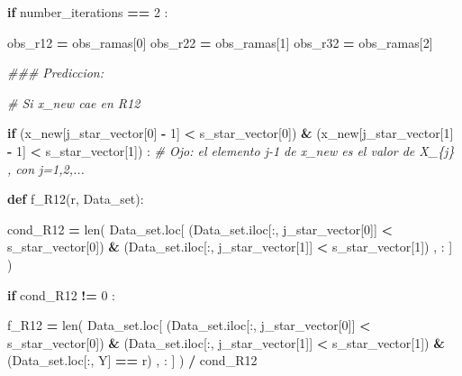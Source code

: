 \documentclass[
  11pt,
  a4paper,
]{article}
\newenvironment{Shaded}{\begin{snugshade}}{\end{snugshade}}
\newcommand{\BuiltInTok}[1]{#1}
\newcommand{\CommentTok}[1]{\textcolor[rgb]{0.56,0.35,0.01}{\textit{#1}}}
\newcommand{\ControlFlowTok}[1]{\textcolor[rgb]{0.13,0.29,0.53}{\textbf{#1}}}
\newcommand{\DecValTok}[1]{\textcolor[rgb]{0.00,0.00,0.81}{#1}}
\newcommand{\KeywordTok}[1]{\textcolor[rgb]{0.13,0.29,0.53}{\textbf{#1}}}
\newcommand{\NormalTok}[1]{#1}
\newcommand{\OperatorTok}[1]{\textcolor[rgb]{0.81,0.36,0.00}{\textbf{#1}}}
\newcommand{\StringTok}[1]{\textcolor[rgb]{0.31,0.60,0.02}{#1}}
\begin{document}
\begin{Shaded}
\begin{Highlighting}[]
        
    \ControlFlowTok{if}\NormalTok{ number\_iterations }\OperatorTok{==} \DecValTok{2}\NormalTok{ :}

\NormalTok{            obs\_r12 }\OperatorTok{=}\NormalTok{ obs\_ramas[}\DecValTok{0}\NormalTok{]}
\NormalTok{            obs\_r22 }\OperatorTok{=}\NormalTok{ obs\_ramas[}\DecValTok{1}\NormalTok{]}
\NormalTok{            obs\_r32 }\OperatorTok{=}\NormalTok{ obs\_ramas[}\DecValTok{2}\NormalTok{]}


        \CommentTok{\#\#\# Prediccion:}

            \CommentTok{\# Si x\_new cae en R12}
           
            \ControlFlowTok{if}\NormalTok{ (x\_new[j\_star\_vector[}\DecValTok{0}\NormalTok{] }\OperatorTok{{-}} \DecValTok{1}\NormalTok{] }\OperatorTok{\textless{}}\NormalTok{ s\_star\_vector[}\DecValTok{0}\NormalTok{]) }\OperatorTok{\&}\NormalTok{ (x\_new[j\_star\_vector[}\DecValTok{1}\NormalTok{] }\OperatorTok{{-}} \DecValTok{1}\NormalTok{] }\OperatorTok{\textless{}}\NormalTok{ s\_star\_vector[}\DecValTok{1}\NormalTok{]) :  }\CommentTok{\# Ojo: el elemento j{-}1 de x\_new es el valor de X\_\{j\} , con j=1,2,...}


                \KeywordTok{def}\NormalTok{ f\_R12(r, Data\_set):}

 
\NormalTok{                    cond\_R12 }\OperatorTok{=} \BuiltInTok{len}\NormalTok{( Data\_set.loc[ (Data\_set.iloc[:, j\_star\_vector[}\DecValTok{0}\NormalTok{]] }\OperatorTok{\textless{}}\NormalTok{ s\_star\_vector[}\DecValTok{0}\NormalTok{]) }\OperatorTok{\&}\NormalTok{ (Data\_set.iloc[:, j\_star\_vector[}\DecValTok{1}\NormalTok{]] }\OperatorTok{\textless{}}\NormalTok{ s\_star\_vector[}\DecValTok{1}\NormalTok{]) , : ] ) }

                    \ControlFlowTok{if}\NormalTok{  cond\_R12 }\OperatorTok{!=} \DecValTok{0}\NormalTok{ :}

\NormalTok{                        f\_R12 }\OperatorTok{=} \BuiltInTok{len}\NormalTok{( Data\_set.loc[ (Data\_set.iloc[:, j\_star\_vector[}\DecValTok{0}\NormalTok{]] }\OperatorTok{\textless{}}\NormalTok{ s\_star\_vector[}\DecValTok{0}\NormalTok{]) }\OperatorTok{\&}\NormalTok{ (Data\_set.iloc[:, j\_star\_vector[}\DecValTok{1}\NormalTok{]] }\OperatorTok{\textless{}}\NormalTok{ s\_star\_vector[}\DecValTok{1}\NormalTok{]) }\OperatorTok{\&}\NormalTok{ (Data\_set.loc[:, }\StringTok{\textquotesingle{}Y\textquotesingle{}}\NormalTok{] }\OperatorTok{==}\NormalTok{ r) , : ] ) }\OperatorTok{/}\NormalTok{ cond\_R12}


\end{Highlighting}
\end{Shaded}
\end{document}

